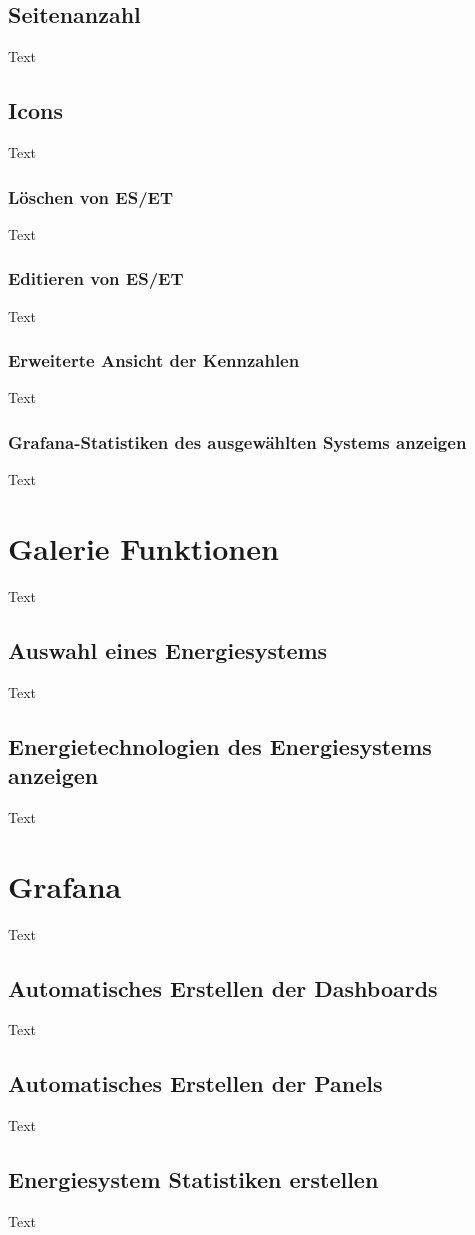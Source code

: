 \subsection{Seitenanzahl}
Text
\subsection{Icons}
Text
\subsubsection{Löschen von ES/ET}
Text
\subsubsection{Editieren von ES/ET}
Text
\subsubsection{Erweiterte Ansicht der Kennzahlen}
Text
\subsubsection{Grafana-Statistiken des ausgewählten Systems anzeigen}
Text


\section{Galerie Funktionen}
Text
\subsection{Auswahl eines Energiesystems}
Text
\subsection{Energietechnologien des Energiesystems anzeigen}
Text


\section{Grafana}
Text
\subsection{Automatisches Erstellen der Dashboards}
Text
\subsection{Automatisches Erstellen der Panels}
Text
\subsection{Energiesystem Statistiken erstellen}
Text

